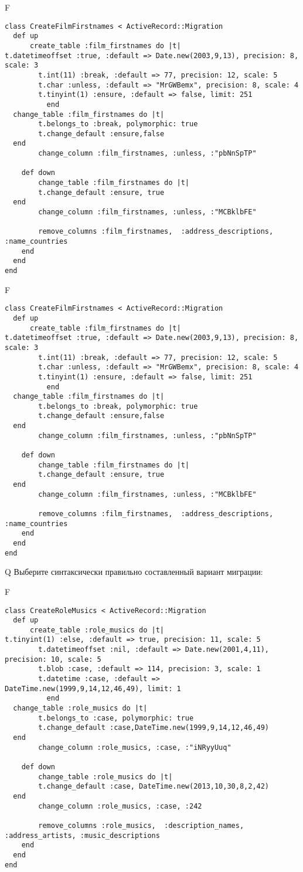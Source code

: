 F
\begin{verbatim}
class CreateFilmFirstnames < ActiveRecord::Migration
  def up
	  create_table :film_firstnames do |t|
t.datetimeoffset :true, :default => Date.new(2003,9,13), precision: 8, scale: 3
		t.int(11) :break, :default => 77, precision: 12, scale: 5
		t.char :unless, :default => "MrGWBemx", precision: 8, scale: 4
		t.tinyint(1) :ensure, :default => false, limit: 251
		  end
  change_table :film_firstnames do |t|
		t.belongs_to :break, polymorphic: true
 		t.change_default :ensure,false
  end
 		change_column :film_firstnames, :unless, :"pbNnSpTP"
   
	def down
		change_table :film_firstnames do |t|
		t.change_default :ensure, true
  end
 		change_column :film_firstnames, :unless, :"MCBklbFE"
   
		remove_columns :film_firstnames,  :address_descriptions, :name_countries 
    end 
  end
end

\end{verbatim}

F
\begin{verbatim}
class CreateFilmFirstnames < ActiveRecord::Migration
  def up
	  create_table :film_firstnames do |t|
t.datetimeoffset :true, :default => Date.new(2003,9,13), precision: 8, scale: 3
		t.int(11) :break, :default => 77, precision: 12, scale: 5
		t.char :unless, :default => "MrGWBemx", precision: 8, scale: 4
		t.tinyint(1) :ensure, :default => false, limit: 251
		  end
  change_table :film_firstnames do |t|
		t.belongs_to :break, polymorphic: true
 		t.change_default :ensure,false
  end
 		change_column :film_firstnames, :unless, :"pbNnSpTP"
   
	def down
		change_table :film_firstnames do |t|
		t.change_default :ensure, true
  end
 		change_column :film_firstnames, :unless, :"MCBklbFE"
   
		remove_columns :film_firstnames,  :address_descriptions, :name_countries 
    end 
  end
end

\end{verbatim}

Q
Выберите синтаксически правильно составленный вариант миграции:

F
\begin{verbatim}
class CreateRoleMusics < ActiveRecord::Migration
  def up
	  create_table :role_musics do |t|
t.tinyint(1) :else, :default => true, precision: 11, scale: 5
		t.datetimeoffset :nil, :default => Date.new(2001,4,11), precision: 10, scale: 5
		t.blob :case, :default => 114, precision: 3, scale: 1
		t.datetime :case, :default => DateTime.new(1999,9,14,12,46,49), limit: 1
		  end
  change_table :role_musics do |t|
		t.belongs_to :case, polymorphic: true
 		t.change_default :case,DateTime.new(1999,9,14,12,46,49)
  end
 		change_column :role_musics, :case, :"iNRyyUuq"
   
	def down
		change_table :role_musics do |t|
		t.change_default :case, DateTime.new(2013,10,30,8,2,42)
  end
 		change_column :role_musics, :case, :242
   
		remove_columns :role_musics,  :description_names, :address_artists, :music_descriptions 
    end 
  end
end

\end{verbatim}

